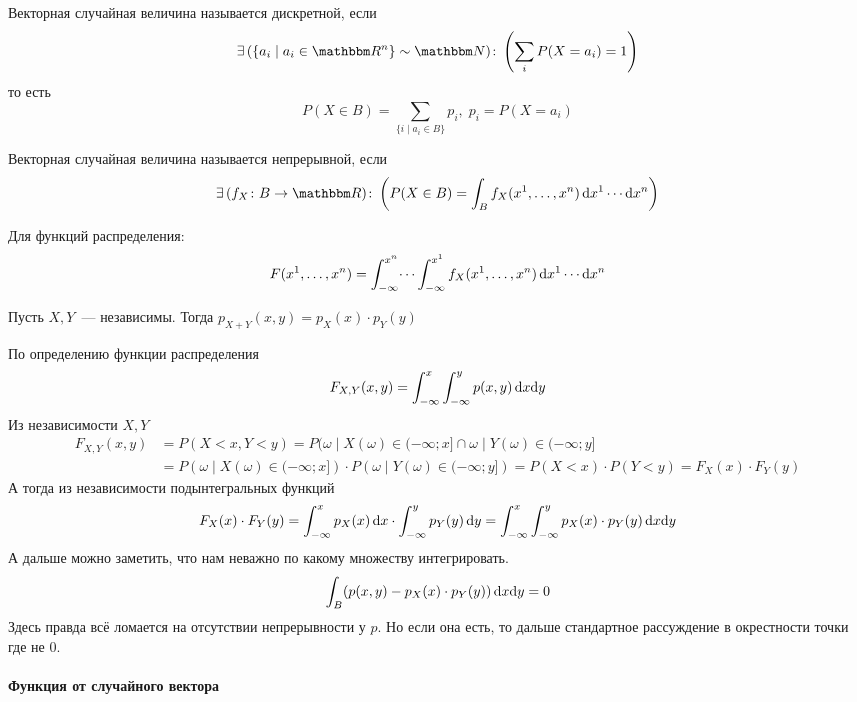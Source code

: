 \documentclass[12pt,timbord]{../../../notes}
\begin{document}
\begin{defn}\label{defn:stat::randvec::disc}
  Векторная случайная величина называется дискретной, если
  \[
    \exists\,(\{a_i\mid a_i \in \R^n \} \sim \N)\colon \left( \sum_{i} P(X = a_i) = 1 \right)
  \]
  то есть 
  \[
    P(X\in B) = \sum_{\{i\mid a_i\in B\}} p_i, \; p_i = P(X = a_i)
  \]
\end{defn}
\begin{defn}\label{defn:stat::randvec::cony}
  Векторная случайная величина называется непрерывной, если
  \[
    \exists\,(f_X\colon B\to \R )\colon \left( P(X\in B) = \int_{B} f_X(x^1, \dotsc, x^n)\, \del
    x^1 \dotsm \del x^n \right)
  \]
\end{defn}
\begin{rem}\label{rem:stat::randvec::distfun }
  Для функций распределения:
  \[
    F(x^1, \dotsc, x^n) = \int_{-\infty}^{x^n}\dotsi\int_{-\infty}^{x^1} f_X(x^1, \dotsc, x^n)\,
    \mathrm{d} x^1 \dotsm \mathrm{d} x^n 
  \]
\end{rem}

\begin{prop}\label{prop:stat::randvec::ind}
  Пусть $X, Y$~--- независимы. Тогда $p_{X+Y}(x,y)=p_X(x) \cdot p_Y(y)$
\end{prop}
\begin{itlproof}
  По определению функции распределения
  \[
    F_{X,Y}(x,y) = \int_{-\infty}^x\int_{-\infty}^y p(x,y) \, \mathrm{d} x\mathrm{d} y
  \]
  Из независимости $X,Y$
  \[
    \begin{split}
      F_{X,Y} (x,y) &= P(X<x,Y<y) = P({\omega\mid X(\omega)\in (-\infty;x]}\cap {\omega\mid
        Y(\omega)\in (-\infty;y]} \\
        &= P({\omega\mid X(\omega)\in (-\infty;x]})\cdot
        P({\omega\mid Y(\omega)\in (-\infty;y]}) = P(X<x) \cdot P(Y<y) = F_X(x)\cdot F_Y(y)
      \end{split}
  \]
  А тогда из независимости подынтегральных функций
  \[
    F_X(x)\cdot F_Y(y) = \int_{-\infty}^x p_X(x) \, \mathrm{d} x \cdot \int_{-\infty}^y p_Y(y) \, \mathrm{d} y 
    = \int_{-\infty}^x\int_{-\infty}^y p_X(x)\cdot p_Y(y) \, \mathrm{d} x\mathrm{d} y
  \]
  А дальше можно заметить, что нам неважно по какому множеству интегрировать.
  \[
    \int_B (p(x,y) - p_X(x)\cdot p_Y(y)) \, \mathrm{d} x\mathrm{d} y = 0
  \]
  Здесь правда всё ломается на отсутствии непрерывности у $p$. Но если она есть, то дальше
  стандартное рассуждение в окрестности точки где не 0.
\end{itlproof}

\paragraph{Функция от случайного вектора}
\label{par:stat::funcrand}
\end{document}
